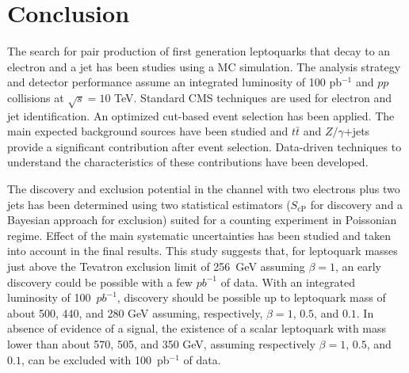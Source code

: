 %

\section{Conclusion}

The search for pair production of first generation leptoquarks that decay to
an electron and a jet has been studies using a MC simulation.
The analysis strategy and detector performance assume an integrated luminosity of 100 pb$^{-1}$ and $pp$ collisions 
at $\sqrt{s}=10$ TeV.
Standard CMS techniques are used for electron and jet identification. 
An optimized cut-based event selection has been applied.
The main expected background sources have been studied and $t\bar{t}$ and $Z/\gamma$+jets 
provide a significant contribution after event selection. 
Data-driven techniques to understand the characteristics of these contributions have been developed.

The discovery and exclusion potential in the channel with two electrons plus two jets has 
been determined using two statistical estimators
($S_\text{cP}$ for discovery and a Bayesian approach for exclusion)
suited for a counting experiment in Poissonian regime.
Effect of the main systematic uncertainties has been studied and taken into account in the final 
results. This study suggests that, 
for leptoquark masses just above the Tevatron exclusion limit of 256~GeV assuming $\beta=1$, 
an early discovery could be possible with a few $pb^{-1}$ of data.
With an integrated luminosity of 100~$pb^{-1}$, discovery should be possible up
to leptoquark mass of about 500, 440, and 280 GeV assuming, respectively, 
$\beta=1$, $0.5$, and $0.1$. 
In absence of evidence of a signal, the existence of a scalar leptoquark 
with mass lower than about 570, 505, and 350 GeV, assuming respectively 
$\beta=1$, $0.5$, and $0.1$, can be excluded with 100~pb$^{-1}$ of data.




%
